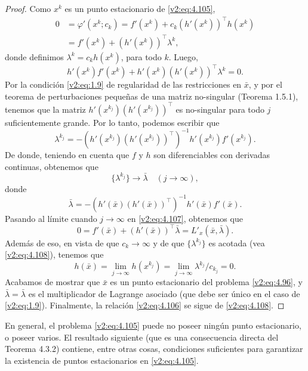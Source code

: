 \begin{proof}
    Como $x^k$ es un punto estacionario de \eqref{v2:eq:4.105},
    \begin{align}
        0 &= \varphi'(x^k; c_k) = f'(x^k) + c_k (h'(x^k))^\top h(x^k) \nonumber \\
        &= f'(x^k) + (h'(x^k))^\top \lambda^k, \label{v2:eq:4.107}
    \end{align}
    donde definimos $\lambda^k = c_k h(x^k)$, para todo $k$. Luego,
    \[
        h'(x^k)f'(x^k) + h'(x^k)(h'(x^k))^\top \lambda^k = 0.
    \]
    Por la condición \eqref{v2:eq:1.9} de regularidad de las restricciones en $\bar{x}$, y por el teorema de perturbaciones pequeñas de una matriz no-singular (Teorema 1.5.1), tenemos que la matriz $h'(x^{k_j})(h'(x^{k_j}))^\top$ es no-singular para todo $j$ suficientemente grande. Por lo tanto, podemos escribir que
    \[
        \lambda^{k_j} = -(h'(x^{k_j})(h'(x^{k_j}))^\top)^{-1} h'(x^{k_j})f'(x^{k_j}).
    \]
    De donde, teniendo en cuenta que $f$ y $h$ son diferenciables con derivadas continuas, obtenemos que
    \begin{equation}
        \{\lambda^{k_j}\} \to \bar{\lambda} \quad (j \to \infty),
        \label{v2:eq:4.108}
    \end{equation}
    donde
    \[
        \bar{\lambda} = -(h'(\bar{x})(h'(\bar{x}))^\top)^{-1} h'(\bar{x})f'(\bar{x}).
    \]
    Pasando al límite cuando $j \to \infty$ en \eqref{v2:eq:4.107}, obtenemos que
    \[
        0 = f'(\bar{x}) + (h'(\bar{x}))^\top \bar{\lambda} = L'_x(\bar{x}, \bar{\lambda}).
    \]
    Además de eso, en vista de que $c_k \to \infty$ y de que $\{\lambda^{k_j}\}$ es acotada (vea \eqref{v2:eq:4.108}), tenemos que
    \[
        h(\bar{x}) = \lim_{j \to \infty} h(x^{k_j}) = \lim_{j \to \infty} \lambda^{k_j}/c_{k_j} = 0.
    \]
    Acabamos de mostrar que $\bar{x}$ es un punto estacionario del problema \eqref{v2:eq:4.96}, y $\bar{\lambda} = \bar{\lambda}$ es el multiplicador de Lagrange asociado (que debe ser único en el caso de \eqref{v2:eq:1.9}). Finalmente, la relación \eqref{v2:eq:4.106} se sigue de \eqref{v2:eq:4.108}.
\end{proof}

En general, el problema \eqref{v2:eq:4.105} puede no poseer ningún punto estacionario, o poseer varios. El resultado siguiente (que es una consecuencia directa del Teorema 4.3.2) contiene, entre otras cosas, condiciones suficientes para garantizar la existencia de puntos estacionarios en \eqref{v2:eq:4.105}.

